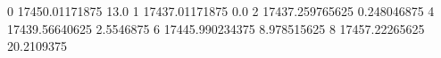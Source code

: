 0 17450.01171875 13.0
1 17437.01171875 0.0
2 17437.259765625 0.248046875
4 17439.56640625 2.5546875
6 17445.990234375 8.978515625
8 17457.22265625 20.2109375
